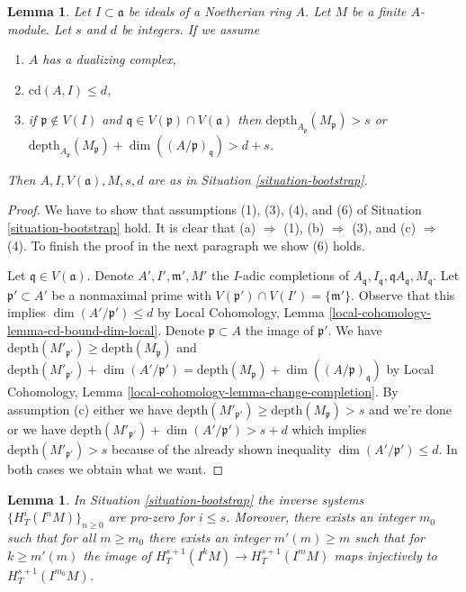 \documentclass{stacks-project}
\theoremstyle{plain}
\newtheorem{lemma}[subsection]{Lemma}
\theoremstyle{definition}
\theoremstyle{remark}
\numberwithin{equation}{subsection}
\begin{document}
\begin{lemma}
\label{lemma-bootstrap-bis-bis}
Let $I \subset \mathfrak a$ be ideals of a Noetherian ring $A$.
Let $M$ be a finite $A$-module. Let $s$ and $d$ be integers.
If we assume
\begin{enumerate}
\item[(a)] $A$ has a dualizing complex,
\item[(b)] $\text{cd}(A, I) \leq d$,
\item[(c)] if $\mathfrak p \not \in V(I)$ and
$\mathfrak q \in V(\mathfrak p) \cap V(\mathfrak a)$ then
$\text{depth}_{A_\mathfrak p}(M_\mathfrak p) > s$ or
$\text{depth}_{A_\mathfrak p}(M_\mathfrak p) +
\dim((A/\mathfrak p)_\mathfrak q) > d + s$.
\end{enumerate}
Then $A, I, V(\mathfrak a), M, s, d$ are as in
Situation \ref{situation-bootstrap}.
\end{lemma}

\begin{proof}
We have to show that assumptions (1), (3), (4), and (6) of
Situation \ref{situation-bootstrap} hold.
It is clear that (a) $\Rightarrow$ (1),
(b) $\Rightarrow$ (3), and (c) $\Rightarrow$ (4).
To finish the proof in the next paragraph we show (6) holds.

\medskip\noindent
Let $\mathfrak q \in V(\mathfrak a)$.
Denote $A', I', \mathfrak m', M'$
the $I$-adic completions of
$A_\mathfrak q, I_\mathfrak q, \mathfrak qA_\mathfrak q, M_\mathfrak q$.
Let $\mathfrak p' \subset A'$ be a nonmaximal prime with
$V(\mathfrak p') \cap V(I') = \{\mathfrak m'\}$.
Observe that this implies $\dim(A'/\mathfrak p') \leq d$
by Local Cohomology, Lemma \ref{local-cohomology-lemma-cd-bound-dim-local}.
Denote $\mathfrak p \subset A$ the image of $\mathfrak p'$.
We have
$\text{depth}(M'_{\mathfrak p'}) \geq \text{depth}(M_\mathfrak p)$ and
$\text{depth}(M'_{\mathfrak p'}) +
\dim(A'/\mathfrak p') =
\text{depth}(M_\mathfrak p) +
\dim((A/\mathfrak p)_\mathfrak q)$
by Local Cohomology, Lemma \ref{local-cohomology-lemma-change-completion}.
By assumption (c) either we have
$\text{depth}(M'_{\mathfrak p'}) \geq \text{depth}(M_\mathfrak p) > s$
and we're done or we have
$\text{depth}(M'_{\mathfrak p'}) +
\dim(A'/\mathfrak p') > s + d$ which implies
$\text{depth}(M'_{\mathfrak p'}) > s$ because of the already shown
inequality $\dim(A'/\mathfrak p') \leq d$. In both cases we
obtain what we want.
\end{proof}

\begin{lemma}
\label{lemma-bootstrap}
In Situation \ref{situation-bootstrap} the inverse systems
$\{H^i_T(I^nM)\}_{n \geq 0}$ are pro-zero for $i \leq s$.
Moreover, there exists an integer $m_0$ such that for all
$m \geq m_0$ there exists an integer $m'(m) \geq m$ such that for
$k \geq m'(m)$ the image of
$H^{s + 1}_T(I^kM) \to H^{s + 1}_T(I^mM)$
maps injectively to $H^{s + 1}_T(I^{m_0}M)$.
\end{lemma}
\end{document}
